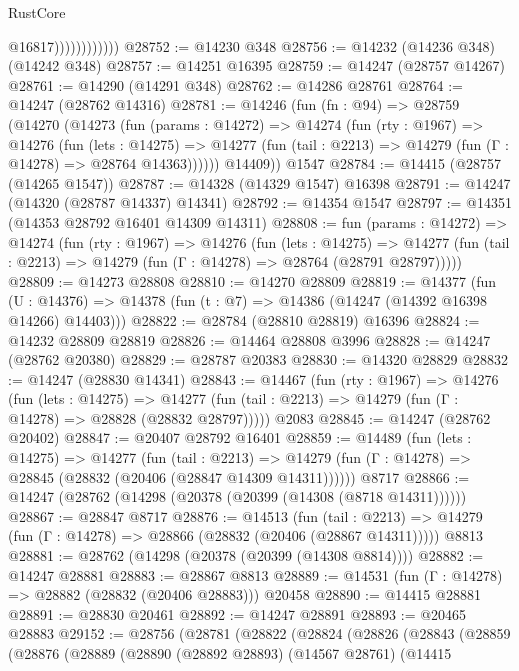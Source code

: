 \begin{lexlean}{RustCore}
\begin{coremodule}
                            @16817))))))))))))
@28752 := @14230 @348
@28756 := @14232 (@14236 @348) (@14242 @348)
@28757 := @14251 @16395
@28759 := @14247 (@28757 @14267)
@28761 := @14290 (@14291 @348)
@28762 := @14286 @28761
@28764 := @14247 (@28762 @14316)
@28781 := @14246
    (fun (fn : @94) =>
    @28759
      (@14270
        (@14273
          (fun (params : @14272) =>
          @14274
            (fun (rty : @1967) =>
            @14276
              (fun (lets : @14275) =>
              @14277 (fun (tail : @2213) => @14279 (fun (Γ : @14278) => @28764 @14363))))))
        @14409))
    @1547
@28784 := @14415 (@28757 (@14265 @1547))
@28787 := @14328 (@14329 @1547) @16398
@28791 := @14247 (@14320 (@28787 @14337) @14341)
@28792 := @14354 @1547
@28797 := @14351 (@14353 @28792 @16401 @14309 @14311)
@28808 := fun (params : @14272) =>
  @14274
    (fun (rty : @1967) =>
    @14276
      (fun (lets : @14275) =>
      @14277 (fun (tail : @2213) => @14279 (fun (Γ : @14278) => @28764 (@28791 @28797)))))
@28809 := @14273 @28808
@28810 := @14270 @28809
@28819 := @14377
    (fun (U : @14376) => @14378 (fun (t : @7) => @14386 (@14247 (@14392 @16398 @14266) @14403)))
@28822 := @28784 (@28810 @28819) @16396
@28824 := @14232 @28809 @28819
@28826 := @14464 @28808 @3996
@28828 := @14247 (@28762 @20380)
@28829 := @28787 @20383
@28830 := @14320 @28829
@28832 := @14247 (@28830 @14341)
@28843 := @14467
    (fun (rty : @1967) =>
    @14276
      (fun (lets : @14275) =>
      @14277 (fun (tail : @2213) => @14279 (fun (Γ : @14278) => @28828 (@28832 @28797)))))
    @2083
@28845 := @14247 (@28762 @20402)
@28847 := @20407 @28792 @16401
@28859 := @14489
    (fun (lets : @14275) =>
    @14277
      (fun (tail : @2213) =>
      @14279 (fun (Γ : @14278) => @28845 (@28832 (@20406 (@28847 @14309 @14311))))))
    @8717
@28866 := @14247 (@28762 (@14298 (@20378 (@20399 (@14308 (@8718 @14311))))))
@28867 := @28847 @8717
@28876 := @14513
    (fun (tail : @2213) => @14279 (fun (Γ : @14278) => @28866 (@28832 (@20406 (@28867 @14311)))))
    @8813
@28881 := @28762 (@14298 (@20378 (@20399 (@14308 @8814))))
@28882 := @14247 @28881
@28883 := @28867 @8813
@28889 := @14531 (fun (Γ : @14278) => @28882 (@28832 (@20406 @28883))) @20458
@28890 := @14415 @28881
@28891 := @28830 @20461
@28892 := @14247 @28891
@28893 := @20465 @28883
@29152 := @28756
    (@28781
      (@28822
        (@28824
          (@28826
            (@28843
              (@28859
                (@28876
                  (@28889
                    (@28890
                      (@28892 @28893)
                      (@14567 @28761)
                      (@14415

\end{coremodule}
\end{lexlean}
